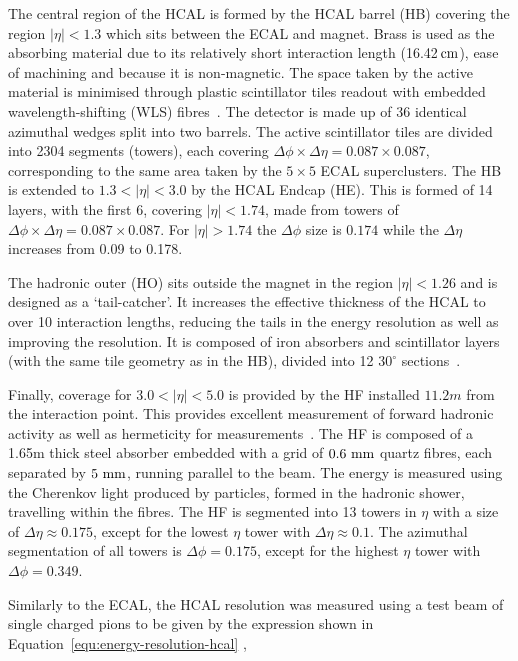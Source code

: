 The central region of the HCAL is formed by the HCAL barrel (HB) covering the region $|\eta| < 1.3$ which sits between
the ECAL and magnet. Brass is used as the absorbing material due to its relatively short interaction length (16.42$\,\text{cm}$), ease of machining 
and because it is non-magnetic. The space taken by the active material is minimised through plastic scintillator tiles
readout with embedded wavelength-shifting (WLS) fibres~\cite{CMS}. The detector is made up of 36 identical azimuthal wedges split into two barrels.
The active scintillator tiles are divided into 2304 segments (towers), each covering $\Delta\phi \times \Delta\eta = 0.087 × 0.087$, corresponding to the 
same area taken by the $5\times5$ ECAL superclusters. The HB is extended to $ 1.3 < |\eta| < 3.0$ by the HCAL Endcap (HE). This is formed of 14 layers, 
with the first 6, covering  $|\eta| < 1.74$, made from towers of $\Delta\phi \times \Delta\eta = 0.087 × 0.087$. For $|\eta| > 1.74$ the $\Delta\phi$
size is $0.174$ while the $\Delta\eta$ increases from 0.09 to 0.178.

The hadronic outer (HO) sits outside the magnet in the region $|\eta| < 1.26$ and is designed as a `tail-catcher'.
It increases the effective thickness of the HCAL to over 10 interaction lengths, reducing the tails in the energy resolution
as well as improving the \met resolution. It is composed of iron absorbers and scintillator layers (with the same tile geometry as in the HB), divided into 
12 $30^\circ$ sections~\cite{hcal_tdr}. 

Finally, coverage for $3.0 < |\eta| < 5.0$ is provided by the HF installed $11.2 m$ from the interaction point. This provides
excellent measurement of forward hadronic activity as well as hermeticity for \met measurements~\cite{hcal_tdr}. The HF is composed of a 1.65m thick steel absorber 
embedded with a grid of $0.6\,\,\text{mm}$ quartz fibres, each separated by $5\,\,\text{mm}$, running parallel to the beam. The energy is measured using the Cherenkov
light produced by particles, formed in the hadronic shower, travelling within the fibres. The HF is segmented into 13 towers in $\eta$ with a
size of $\Delta\eta \approx 0.175$, except for the lowest $\eta$ tower with $\Delta\eta \approx 0.1$. The azimuthal segmentation of all towers is 
$\Delta\phi = 0.175$, except for the highest $\eta$ tower with $\Delta\phi = 0.349$.

Similarly to the ECAL, the HCAL resolution was measured using a test beam of single charged pions to be given by the expression shown in Equation~\ref{equ:energy-resolution-hcal} 
\cite{hcal_performance},

